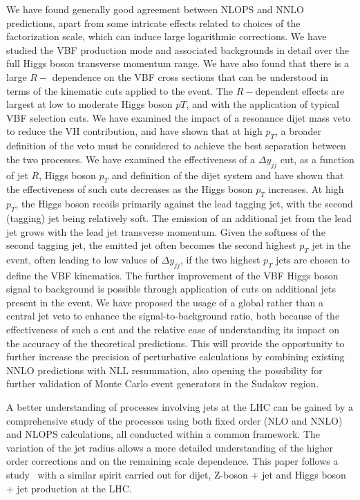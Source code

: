 \documentclass[10pt,prd,fleqn,superscriptaddress,notitlepage,nofootinbib,preprintnumbers,nobalancelastpage]{revtex4-1}
\newcommand{\VBF}{VBF\xspace}
\newcommand{\VH}{VH\xspace}
\begin{document}
We have found generally good agreement between NLOPS and NNLO predictions, apart from some intricate effects related to choices of the factorization scale, which can induce large logarithmic corrections.   We have studied the \VBF production mode and associated backgrounds in detail over the full Higgs boson transverse momentum range. We have also found that there is a large $R-$ dependence on the \VBF cross sections  that can be understood in terms of the kinematic  cuts applied to the event. The $R-$dependent effects are largest at low to moderate Higgs boson $pT$, and with the application of typical \VBF selection cuts.  We have examined the impact of a resonance dijet mass veto to reduce the \VH contribution, and have shown that at high $p_T$, a broader definition of the veto must be considered to achieve the best separation between the two processes. We have examined the effectiveness of a $\Delta y_{jj}$ cut, as a function of jet $R$, Higgs boson $p_T$ and definition of the dijet system and have shown that the effectiveness of such cuts decreases as the Higgs boson $p_T$ increases. At high $p_T$, the Higgs boson recoils primarily against the lead tagging jet, with the second (tagging) jet being relatively soft. The emission of an additional jet from the lead jet grows with the lead jet transverse momentum. Given the softness of the second tagging jet, the emitted jet often becomes the second highest $p_T$ jet in the event, often leading to low values of $\Delta y_{jj}$, if the two highest $p_T$ jets are chosen to define the \VBF kinematics.  The further improvement of the \VBF Higgs boson signal to background is possible through application of cuts on additional jets present in the event. We  have proposed the usage of a global rather than a central jet veto to enhance the signal-to-background ratio, both because of the effectiveness of such a cut and the relative ease of understanding its impact on the accuracy of the theoretical predictions. This will provide the opportunity to further increase the  precision of perturbative calculations by combining existing NNLO predictions with NLL resummation, also opening the possibility for further validation of Monte Carlo event generators in the Sudakov region.

A better understanding of processes involving jets at the LHC can be gained by a comprehensive study of the processes using both fixed order (NLO and NNLO) and NLOPS calculations, all conducted within a common framework. The variation of the jet radius allows a more detailed understanding of the higher order corrections and on the remaining scale dependence. This paper follows a study~\cite{Bellm:2019yyh} with a similar spirit carried out for dijet, Z-boson + jet and Higgs boson + jet production at the LHC.
\end{document}
